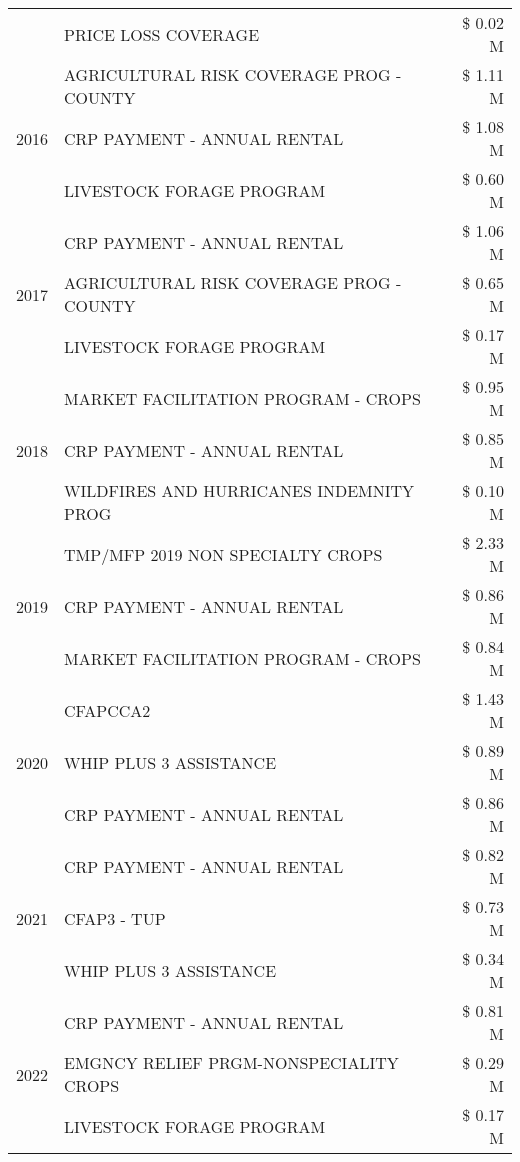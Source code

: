 \begin{tabular}{llr}
 & PRICE LOSS COVERAGE & \$ 0.02 M \\
\cline{1-3}
\multirow[t]{3}{*}{2016} & AGRICULTURAL RISK COVERAGE PROG - COUNTY & \$ 1.11 M \\
 & CRP PAYMENT - ANNUAL RENTAL & \$ 1.08 M \\
 & LIVESTOCK FORAGE PROGRAM & \$ 0.60 M \\
\cline{1-3}
\multirow[t]{3}{*}{2017} & CRP PAYMENT - ANNUAL RENTAL & \$ 1.06 M \\
 & AGRICULTURAL RISK COVERAGE PROG - COUNTY & \$ 0.65 M \\
 & LIVESTOCK FORAGE PROGRAM & \$ 0.17 M \\
\cline{1-3}
\multirow[t]{3}{*}{2018} & MARKET FACILITATION PROGRAM - CROPS & \$ 0.95 M \\
 & CRP PAYMENT - ANNUAL RENTAL & \$ 0.85 M \\
 & WILDFIRES AND HURRICANES INDEMNITY PROG & \$ 0.10 M \\
\cline{1-3}
\multirow[t]{3}{*}{2019} & TMP/MFP 2019 NON SPECIALTY CROPS & \$ 2.33 M \\
 & CRP PAYMENT - ANNUAL RENTAL & \$ 0.86 M \\
 & MARKET FACILITATION PROGRAM - CROPS & \$ 0.84 M \\
\cline{1-3}
\multirow[t]{3}{*}{2020} & CFAPCCA2 & \$ 1.43 M \\
 & WHIP PLUS 3 ASSISTANCE & \$ 0.89 M \\
 & CRP PAYMENT - ANNUAL RENTAL & \$ 0.86 M \\
\cline{1-3}
\multirow[t]{3}{*}{2021} & CRP PAYMENT - ANNUAL RENTAL & \$ 0.82 M \\
 & CFAP3 - TUP & \$ 0.73 M \\
 & WHIP PLUS 3 ASSISTANCE & \$ 0.34 M \\
\cline{1-3}
\multirow[t]{3}{*}{2022} & CRP PAYMENT - ANNUAL RENTAL & \$ 0.81 M \\
 & EMGNCY RELIEF PRGM-NONSPECIALITY CROPS & \$ 0.29 M \\
 & LIVESTOCK FORAGE PROGRAM & \$ 0.17 M \\
\cline{1-3}
\bottomrule
\end{tabular}
